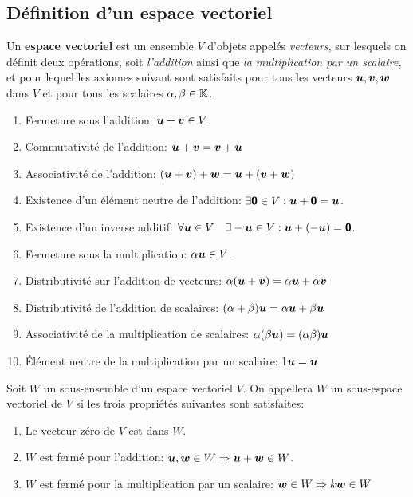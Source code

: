 \begin{adjmulticols}{1}{0in}{-2in}
\section{Définition d'un espace vectoriel}

Un \textbf{espace vectoriel} est un ensemble $V$ d'objets appelés \textit{vecteurs}, sur lesquels on définit
deux opérations, soit \textit{l'addition} ainsi que \textit{la multiplication par un scalaire}, et pour lequel
les axiomes suivant sont satisfaits pour tous les vecteurs $\boldsymbol{u}, \boldsymbol{v}, \boldsymbol{w}$ dans $V$
et pour tous les scalaires $\alpha, \beta \in \mathbb{K}$.
\begin{enumerate}
\item Fermeture sous l'addition: $\boldsymbol{u}+\boldsymbol{v}\in V$.
\item Commutativité de l'addition: $\boldsymbol{u} + \boldsymbol{v} = \boldsymbol{v} + \boldsymbol{u}$
\item Associativité de l'addition: $ (\boldsymbol{u} + \boldsymbol{v}) + \boldsymbol{w} = \boldsymbol{u} + (\boldsymbol{v} + \boldsymbol{w})$
\item Existence d'un élément neutre de l'addition: $\exists\mbox{\textsf{\textbf{{0}}}}\in V:  \boldsymbol{u} + \mbox{\textsf{\textbf{{0}}}} = \boldsymbol{u}$.
\item Existence d'un inverse additif: $\forall \boldsymbol{u}\in V\quad \exists-\boldsymbol{u}\in V: \boldsymbol{u} + (-\boldsymbol{u}) = \mbox{\textsf{\textbf{{0}}}}$.
\item Fermeture sous la multiplication: $\alpha\boldsymbol{u} \in V$.
\item Distributivité sur l'addition de vecteurs: $\alpha(\boldsymbol{u} + \boldsymbol{v}) = \alpha\boldsymbol{u} + \alpha\boldsymbol{v}$
\item Distributivité de l'addition de scalaires: $ (\alpha + \beta)\boldsymbol{u} = \alpha\boldsymbol{u} + \beta\boldsymbol{u}$
\item Associativité de la multiplication de scalaires: $\alpha(\beta\boldsymbol{u}) = (\alpha\beta)\boldsymbol{u}$
\item Élément neutre de la multiplication par un scalaire: $1\boldsymbol{u} = \boldsymbol{u}$
\end{enumerate}


Soit $W$ un sous-ensemble d'un espace vectoriel $V$.  
On appellera $W$ un sous-espace vectoriel de $V$ si
les trois propriétés suivantes sont satisfaites:
\begin{enumerate}
\item Le vecteur zéro de $V$ est dans $W$.
\item $W$ est fermé pour l'addition: $\boldsymbol{u}, \boldsymbol{w} \in W \Rightarrow \boldsymbol{u} + \boldsymbol{w} \in W$.
\item $W$ est fermé pour la multiplication par un scalaire: $\boldsymbol{w}\in W \Rightarrow k\boldsymbol{w}\in W$
\end{enumerate}


\end{adjmulticols}
